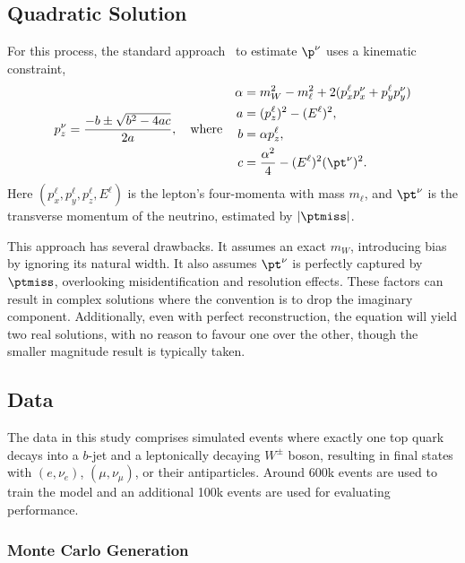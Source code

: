 \subsection{Quadratic Solution}

For this process, the standard approach~\cite{Quad1, Quad2, Quad4, Quad5} to estimate $\p^\nu$ uses a kinematic constraint,
\begin{equation}
    \label{eq:quadratic}
    p_z^\nu = \frac{-b \pm \sqrt{b^2-4ac}}{2a}, \quad \text{where} \quad
    \begin{aligned}
        \alpha &= m_W^2 - m_\ell^2+2(p_x^\ell p_x^\nu+p_y^\ell p_y^\nu) \\
        a &= (p_z^\ell)^2 - (E^\ell)^2, \\
        b &= \alpha p_z^\ell, \\
        c &= \frac{\alpha^2}{4}-(E^\ell)^2(\pt^\nu)^2.
    \end{aligned}
\end{equation}
Here $(p_x^\ell, p_y^\ell, p_z^\ell, E^\ell)$ is the lepton's four-momenta with mass $m_\ell$, and $\pt^\nu$ is the transverse momentum of the neutrino, estimated by $|\ptmiss|$.

This approach has several drawbacks.
It assumes an exact $m_W$, introducing bias by ignoring its natural width.
It also assumes $\pt^\nu$ is perfectly captured by $\ptmiss$, overlooking misidentification and resolution effects.
These factors can result in complex solutions where the convention is to drop the imaginary component.
Additionally, even with perfect reconstruction, the equation will yield two real solutions, with no reason to favour one over the other, though the smaller magnitude result is typically taken.

\subsection{Data}
\label{sec:data}

The data in this study comprises simulated \ttbar events where exactly one top quark decays into a $b$-jet and a leptonically decaying $W^\pm$ boson, resulting in final states with $(e,\nu_e)$, $(\mu,\nu_\mu)$, or their antiparticles.
Around 600k events are used to train the model and an additional 100k events are used for evaluating performance.

\subsubsection{Monte Carlo Generation}

